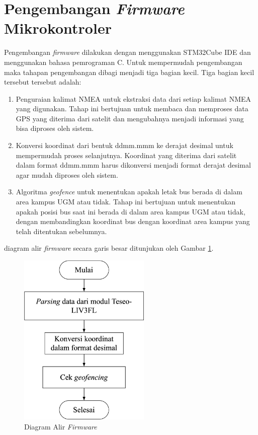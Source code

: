 \section{Pengembangan \textit{Firmware} Mikrokontroler}
Pengembangan \textit{firmware} dilakukan dengan menggunakan STM32Cube IDE dan menggunakan bahasa pemrograman C. Untuk mempermudah pengembangan maka tahapan pengembangan dibagi menjadi tiga bagian kecil. Tiga bagian kecil tersebut tersebut adalah:
\begin{enumerate}
	\item Penguraian kalimat NMEA untuk ekstraksi data dari setiap kalimat NMEA yang digunakan. Tahap ini bertujuan untuk membaca dan memproses data GPS yang diterima dari satelit dan mengubahnya menjadi informasi yang bisa diproses oleh sistem.
	\item Konversi koordinat dari bentuk ddmm.mmm ke derajat desimal untuk mempermudah proses selanjutnya. Koordinat yang diterima dari satelit dalam format ddmm.mmm harus dikonversi menjadi format derajat desimal agar mudah diproses oleh sistem.
	\item Algoritma \textit{geofence} untuk menentukan apakah letak bus berada di dalam area kampus UGM atau tidak. Tahap ini bertujuan untuk menentukan apakah posisi bus saat ini berada di dalam area kampus UGM atau tidak, dengan membandingkan koordinat bus dengan koordinat area kampus yang telah ditentukan sebelumnya.
\end{enumerate}
diagram alir \textit{firmware} secara garis besar ditunjukan oleh Gambar \ref{Fig: flowchart-firmware}.

\begin{figure}[H]
	\centering
	\includegraphics[width=6.3cm]{contents/chapter-3/firmware-diagram.png}
	\caption{Diagram Alir \textit{Firmware}}
	\label{Fig: flowchart-firmware}
\end{figure}

